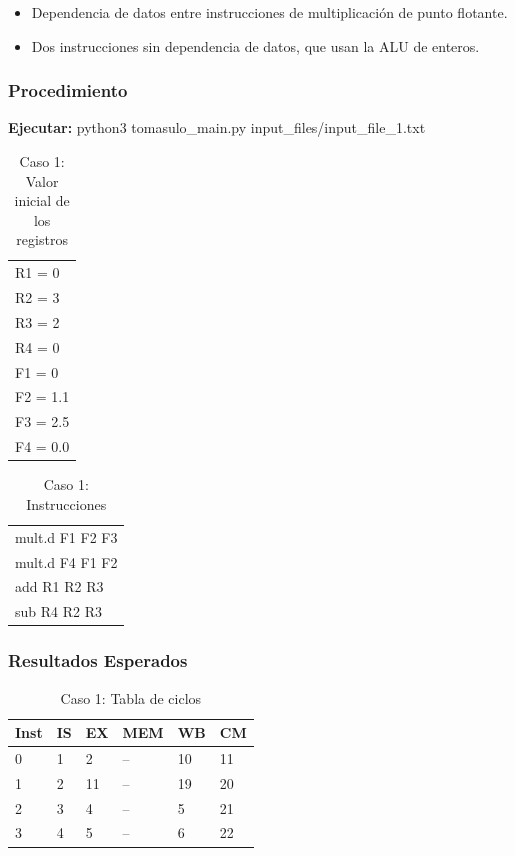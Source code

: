 \documentclass[a4paper]{article}
\begin{document}
	\begin{itemize}
		\item Dependencia de datos entre instrucciones de multiplicación de punto flotante.
		\item Dos instrucciones sin dependencia de datos, que usan la ALU de enteros. 
	\end{itemize}

	\subsubsection*{Procedimiento}

	\textbf{Ejecutar:} python3 tomasulo\_main.py input\_files/input\_file\_1.txt

	
	\begin{table}[H]
		\centering
		\caption*{Caso 1: Valor inicial de los registros}
		\begin{tabular}{l}
		R1 = 0 \\
		R2 = 3 \\
		R3 = 2 \\
		R4 = 0 \\
		F1 = 0 \\
		F2 = 1.1 \\
		F3 = 2.5 \\
		F4 = 0.0
		\end{tabular}
	\end{table}

	\begin{table}[H]
		\centering
		\caption*{Caso 1: Instrucciones}
		\begin{tabular}{l}
		mult.d F1 F2 F3 \\
		mult.d F4 F1 F2 \\
		add R1 R2 R3 \\
		sub R4 R2 R3
		\end{tabular}
	\end{table}
	
	\subsubsection*{Resultados Esperados}

	\begin{table}[H]
		\centering
		\caption*{Caso 1: Tabla de ciclos}
		\begin{tabular}{|l|l|l|l|l|l|}
		\hline
		\textbf{Inst} & \textbf{IS} & \textbf{EX} & \textbf{MEM} & \textbf{WB} & \textbf{CM} \\ \hline
		0             & 1           & 2           & --           & 10          & 11          \\ \hline
		1             & 2           & 11          & --           & 19          & 20          \\ \hline
		2             & 3           & 4           & --           & 5           & 21          \\ \hline
		3             & 4           & 5           & --           & 6           & 22          \\ \hline
		\end{tabular}
	\end{table}
\end{document}
